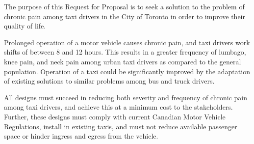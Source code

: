 The purpose of this Request for Proposal is to seek a solution to the
problem of chronic pain among taxi drivers in the City of Toronto in
order to improve their quality of life.

Prolonged operation of a motor vehicle causes chronic pain, and taxi
drivers work shifts of between 8 and 12 hours. This results in a
greater frequency of lumbago, knee pain, and neck pain among urban
taxi drivers as compared to the general population. Operation of a
taxi could be significantly improved by the adaptation of existing
solutions to similar problems among bus and truck drivers.

All designs must succeed in reducing both severity and frequency of
chronic pain among taxi drivers, and achieve this at a minimum cost to
the stakeholders. Further, these designs must comply with current
Canadian Motor Vehicle Regulations, install in existing taxis, and
must not reduce available passenger space or hinder ingress and
egress from the vehicle.
